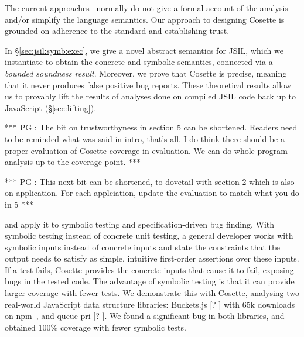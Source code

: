 \documentclass[sigconf, review]{acmart}
\newcommand{\jsil}{JSIL\xspace}
\newcommand{\JSComp}{JS-2-JSIL\xspace}
\newcommand{\cosette}{Cosette\xspace}
\newcommand{\pgmaxinline}[1]{ {\color{purple} *** PG : #1 ***} }
\begin{document}
The current approaches~\cite{.} normally do not give a formal account
of the analysis and/or simplify the language semantics. Our approach
to designing \cosette is grounded on adherence to the standard and
establishing trust. 









In \S\ref{sec:jsil:symb:exec}, we give a novel abstract semantics for \jsil, which we instantiate to obtain the concrete and symbolic semantics, connected via a {\em bounded soundness result}. Moreover, we prove that \cosette is precise, meaning that it never produces false positive bug reports. 
These theoretical results %
allow us to  provably lift the results of analyses done on compiled
\jsil code back up to JavaScript (\S\ref{sec:lifting}). %


\pgmaxinline{The bit on trustworthyness in section 5 can be
  shortened. Readers need to be reminded what was said in intro,
  that's all. I do think there should be a proper evaluation of
  Cosette coverage in evaluation. We can do whole-program analysis up
  to the coverage point.} 


\pgmaxinline{This next bit can be shortened, to dovetail with section
  2 which is also on application. For each applciation, update the
  evaluation to match what you do in 5} 






and apply it to symbolic testing and specification-driven bug
finding. With symbolic testing instead of concrete unit testing, a
general developer works with symbolic inputs instead of concrete
inputs and state the constraints that the output needs to satisfy as
simple, intuitive first-order assertions over these inputs.  If
a test fails, \cosette provides the concrete inputs that cause it to
fail, exposing bugs in the tested code.  The advantage of symbolic
testing is that it can provide larger coverage with fewer tests. We
demonstrate this with Cosette, analysing two real-world JavaScript
data structure libraries: Buckets.js [? ] with 65k downloads on
npm~\cite{.}, and queue-pri [? ]. We found a significant bug in both
libraries, and obtained 100\% coverage with fewer symbolic tests.
\end{document}
